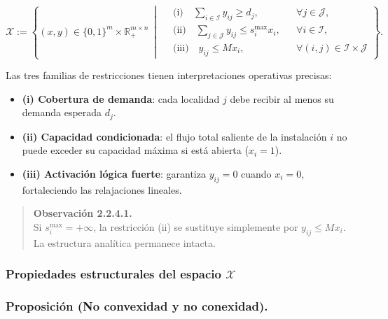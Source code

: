 \documentclass[
  spanish,
  us-letterpaper,
  DIV=11,
  numbers=noendperiod]{scrreprt}
\providecommand{\tightlist}{%
  \setlength{\itemsep}{0pt}\setlength{\parskip}{0pt}}
\numberwithin{equation}{section}
\begin{document}
\[
\mathcal{X} := 
\left\{
(x, y) \in \{0,1\}^m \times \mathbb{R}_+^{m \times n}
\ \middle|\
\begin{aligned}
&\text{(i)}\quad \sum_{i \in \mathcal{I}} y_{ij} \ge d_j, && \forall j \in \mathcal{J}, \\
&\text{(ii)}\quad \sum_{j \in \mathcal{J}} y_{ij} \le s_i^{\max} x_i, && \forall i \in \mathcal{I}, \\
&\text{(iii)}\quad y_{ij} \le M x_i, && \forall (i,j) \in \mathcal{I}\times\mathcal{J}
\end{aligned}
\right\}.
\]

Las tres familias de restricciones tienen interpretaciones operativas
precisas:

\begin{itemize}
\tightlist
\item
  \textbf{(i) Cobertura de demanda}: cada localidad \(j\) debe recibir
  al menos su demanda esperada \(d_j\).
\item
  \textbf{(ii) Capacidad condicionada}: el flujo total saliente de la
  instalación \(i\) no puede exceder su capacidad máxima si está abierta
  (\(x_i = 1\)).\\
\item
  \textbf{(iii) Activación lógica fuerte}: garantiza \(y_{ij}=0\) cuando
  \(x_i=0\), fortaleciendo las relajaciones lineales.
\end{itemize}

\begin{quote}
\textbf{Observación 2.2.4.1.}\\
Si \(s_i^{\max} = +\infty\), la restricción (ii) se sustituye
simplemente por \(y_{ij} \le M x_i\). La estructura analítica permanece
intacta.
\end{quote}

\subsubsection{\texorpdfstring{\textbf{Propiedades estructurales del
espacio
\(\mathcal{X}\)}}{Propiedades estructurales del espacio \textbackslash mathcal\{X\}}}\label{propiedades-estructurales-del-espacio-mathcalx}

\subsubsection{\texorpdfstring{\textbf{Proposición (No convexidad y no
conexidad).}}{Proposición (No convexidad y no conexidad).}}\label{proposiciuxf3n-no-convexidad-y-no-conexidad.}
\end{document}

